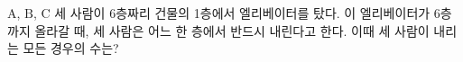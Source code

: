 $\mathrm{A}$, $\mathrm{B}$, $\mathrm{C}$ 세 사람이 6층짜리 건물의 1층에서 엘리베이터를 탔다. 이 엘리베이터가 6층까지 올라갈 때, 세 사람은 어느 한 층에서 반드시 내린다고 한다. 이때 세 사람이 내리는 모든 경우의 수는? 
